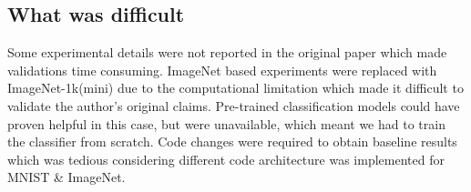
\subsection*{What was difficult}


Some experimental details were not reported in the original paper which made validations time consuming. ImageNet based experiments were replaced with ImageNet-1k(mini) due to the computational limitation which made it difficult to validate the author's original claims. Pre-trained classification models could have proven helpful in this case, but were unavailable, which meant we had to train the classifier from scratch. Code changes were required to obtain baseline results which was tedious considering different code architecture was implemented for MNIST \& ImageNet.

